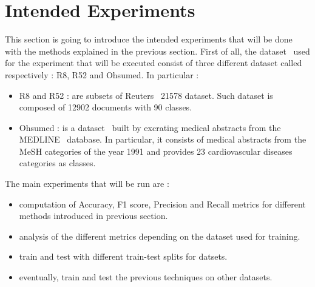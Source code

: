 \section{Intended Experiments}
This section is going to introduce the intended experiments that will be done with the methods explained in the previous section. 
First of all, the dataset~\cite{dataset-r8r52ohsumed} used for the experiment that will be executed consist of three different dataset called respectively : R8, R52 and Ohsumed. In particular :
\begin{itemize}
    \item R8 and R52 : are subsets of Reuters~\cite{dataset-reuters} 21578 dataset. Such dataset is composed of 12902 documents with 90 classes.
    \item Ohsumed : is a dataset~\cite{dataset-ohsumed} built by excrating medical abstracts from the MEDLINE~\cite{medline-website} database. In particular, it consists of medical abstracts from the MeSH categories of the year 1991 and provides 23 cardiovascular diseases categories as classes.
\end{itemize}
The main experiments that will be run are :
\begin{itemize}
    \item computation of Accuracy, F1 score, Precision and Recall metrics for different methods introduced in previous section.
    \item analysis of the different metrics depending on the dataset used for training.
    \item train and test with different train-test splits for datsets.
    \item eventually, train and test the previous techniques on other datasets.
\end{itemize}